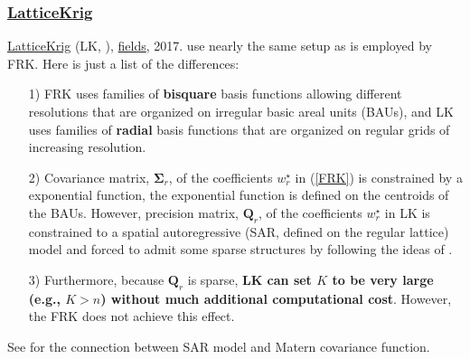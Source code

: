 \documentclass[
12pt, %
a4paper, %
oneside, %
headinclude,footinclude, %
BCOR5mm, %
]{scrartcl}
\begin{document}
\subsubsection{\href{https://chenyw68.github.io/Literature/[2020]LatticeKrigVignette.pdf}{LatticeKrig}}
\href{https://chenyw68.github.io/Literature/[2015]LatticeKrig.pdf}{LatticeKrig} (LK, \href{https://chenyw68.github.io/Literature/[2015]A Multiresolution Gaussian Process Model for the Analysis of Large Spatial Datasets.pdf}{\citep{nychka2015multiresolution}}), \href{https://chenyw68.github.io/Literature/[2020]fields.pdf}{fields}, 2017. 
use nearly the same setup as is employed by FRK. Here is just a list of the differences:
\begin{itemize}
 \item [1)] FRK uses families of \textbf{bisquare} basis functions allowing different resolutions that are organized on \textcolor[rgb]{0.50,0.50,0.50}{irregular} basic areal units (BAUs), and LK uses families of \textbf{radial} basis functions that are organized on \textcolor[rgb]{0.50,0.50,0.50}{regular} grids of increasing resolution.
 \item [2)] Covariance matrix, $\boldsymbol{\Sigma}_r$, of the coefficients $w_r^{\star}$ in (\ref{FRK}) is constrained by a exponential function, the exponential function is defined on the centroids of the BAUs. However, precision matrix, $\boldsymbol{Q}_r$, of the coefficients $w_r^{\star}$ in LK is constrained to a spatial autoregressive (SAR, defined on the regular lattice) model and forced to admit some sparse structures by following the ideas of \href{https://chenyw68.github.io/Literature/[2011]An explicit link between GF and GMRFs the SPDE approach.pdf}{\citet{lindgren2011explicit}}.
 \item [3)] Furthermore, because $\boldsymbol{Q}_r$ is sparse, \textbf{LK can set $K$ to be very large (e.g.,  $K > n$) without much additional computational cost}. However, the FRK does not achieve this effect.
\end{itemize}

See \href{https://chenyw68.github.io/Literature/[2020]Modeling spatial data using local likelihood estimation and a Matern to SAR translation.pdf}{\cite{wiens2020modeling}} for the connection between SAR model and Matern covariance function.
\end{document}
